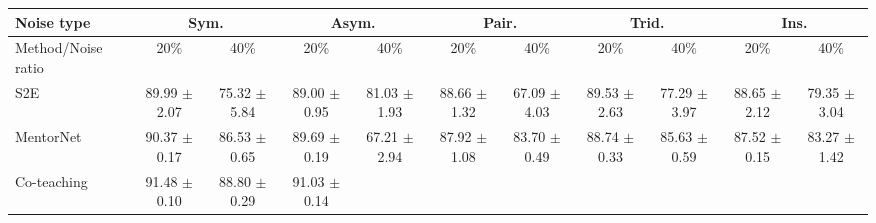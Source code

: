 \documentclass[11pt]{article}
\begin{document}
\begin{table}[!t]
    \small
\centering
	\begin{tabular}{l |cc|cc|cc|cc|cc} 
		\Xhline{3\arrayrulewidth}	 	
		   Noise type &\multicolumn{2}{c|}{Sym.}&\multicolumn{2}{c|}{Asym.}&\multicolumn{2}{c|}{Pair.}&\multicolumn{2}{c|}{Trid.}&\multicolumn{2}{c}{Ins.}\\
			\hline
		   Method/Noise ratio&  20\% & 40\%& 20\% & 40\% &20\% & 40\%& 20\% & 40\% & 20\% & 40\%\\
			\hline
			S2E& \makecell{89.99\\ $\pm$\scriptsize{2.07}}
			& \makecell{75.32\\ $\pm$\scriptsize{5.84}}
			& \makecell{89.00\\ $\pm$\scriptsize{0.95}}
			& \makecell{81.03\\ $\pm$\scriptsize{1.93}}
			& \makecell{88.66\\ $\pm$\scriptsize{1.32}}
			& \makecell{67.09\\ $\pm$\scriptsize{4.03}}
			& \makecell{89.53\\ $\pm$\scriptsize{2.63}}
			& \makecell{77.29\\ $\pm$\scriptsize{3.97}}
			& \makecell{88.65\\ $\pm$\scriptsize{2.12}}
			& \makecell{79.35\\ $\pm$\scriptsize{3.04}}\\
			\hline
			MentorNet & \makecell{90.37\\ $\pm$\scriptsize{0.17}}
			& \makecell{86.53\\ $\pm$\scriptsize{0.65}}
			& \makecell{89.69\\ $\pm$\scriptsize{0.19}}
			& \makecell{67.21\\ $\pm$\scriptsize{2.94}}
			& \makecell{87.92\\ $\pm$\scriptsize{1.08}}
			& \makecell{83.70\\ $\pm$\scriptsize{0.49}}
			& \makecell{88.74\\ $\pm$\scriptsize{0.33}}
			& \makecell{85.63\\ $\pm$\scriptsize{0.59}}
			& \makecell{87.52\\ $\pm$\scriptsize{0.15}}
			& \makecell{83.27\\ $\pm$\scriptsize{1.42}}\\
			\hline
			Co-teaching & \makecell{91.48\\ $\pm$\scriptsize{0.10}}
			& \makecell{88.80\\ $\pm$\scriptsize{0.29}}
			& \makecell{91.03\\ $\pm$\scriptsize{0.14}}

\end{tabular}
\end{table}
\end{document}
